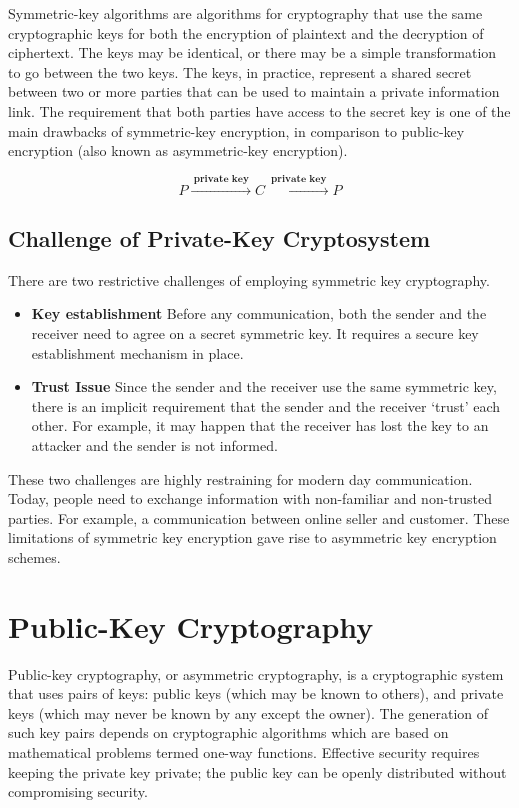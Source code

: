 \documentclass[british]{report}
\begin{document}
Symmetric-key algorithms are algorithms for cryptography that use
the same cryptographic keys for both the encryption of plaintext and
the decryption of ciphertext. The keys may be identical, or there
may be a simple transformation to go between the two keys. The keys,
in practice, represent a shared secret between two or more parties
that can be used to maintain a private information link. The requirement
that both parties have access to the secret key is one of the main
drawbacks of symmetric-key encryption, in comparison to public-key
encryption (also known as asymmetric-key encryption).

\[
	P\xrightarrow{\:\textbf{private key}\:}C\xrightarrow{\:\textbf{private key}\:}P
\]

\medskip{}


\subsection{Challenge of Private-Key Cryptosystem}

There are two restrictive challenges of employing symmetric key cryptography.
\begin{itemize}
	\item \textbf{Key establishment \textminus{}} Before any communication,
	      both the sender and the receiver need to agree on a secret symmetric
	      key. It requires a secure key establishment mechanism in place.
	\item \textbf{Trust Issue \textminus{}} Since the sender and the receiver
	      use the same symmetric key, there is an implicit requirement that
	      the sender and the receiver `trust' each other. For example, it
	      may happen that the receiver has lost the key to an attacker and the
	      sender is not informed.
\end{itemize}
These two challenges are highly restraining for modern day communication.
Today, people need to exchange information with non-familiar and non-trusted
parties. For example, a communication between online seller and customer.
These limitations of symmetric key encryption gave rise to asymmetric
key encryption schemes.

\section{Public-Key Cryptography}

Public-key cryptography, or asymmetric cryptography, is a cryptographic
system that uses pairs of keys: public keys (which may be known to
others), and private keys (which may never be known by any except
the owner). The generation of such key pairs depends on cryptographic
algorithms which are based on mathematical problems termed one-way
functions. Effective security requires keeping the private key private;
the public key can be openly distributed without compromising security.
\end{document}
